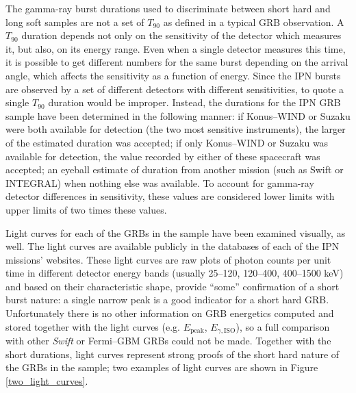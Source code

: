 The gamma-ray burst durations used to discriminate between short hard and long soft samples are not a set of $T_{90}$ as defined in a typical GRB observation. A $T_{90}$ duration depends not only on the sensitivity of the detector which measures it, but also, on its energy range. Even when a single detector measures this time, it is possible to get different numbers for the same burst depending on the arrival angle, which affects the sensitivity as a function of energy. Since the IPN bursts are observed by a set of different detectors with different sensitivities, to quote a single $T_{90}$ duration would be improper. Instead, the durations for the IPN GRB sample have been determined in the following manner: if Konus--WIND or Suzaku were both available for detection (the two most sensitive instruments), the larger of the estimated duration was accepted; if only Konus--WIND or Suzaku was available for detection, the value recorded by either of these spacecraft was accepted; an eyeball estimate of duration from another mission (such as Swift or INTEGRAL) when nothing else was available. To account for gamma-ray detector differences in sensitivity, these values are considered lower limits with upper limits of two times these values.

Light curves for each of the GRBs in the sample have been examined visually, as well. The light curves are available publicly in the databases of each of the IPN missions' websites. These light curves are raw plots of photon counts per unit time in different detector energy bands (usually 25--120, 120--400, 400--1500 keV) and based on their characteristic shape, provide ``some'' confirmation of a short burst nature: a single narrow peak is a good indicator for a short hard GRB. Unfortunately there is no other information on GRB energetics computed and stored together with the light curves (e.g. $E_{\mathrm{peak}}$, $E_{\gamma, \mathrm{ISO}}$), so a full comparison with other \emph{Swift} or Fermi--GBM GRBs could not be made. Together with the short durations, light curves represent strong proofs of the short hard nature of the GRBs in the sample; two examples of light curves are shown in Figure \ref{two_light_curves}.

